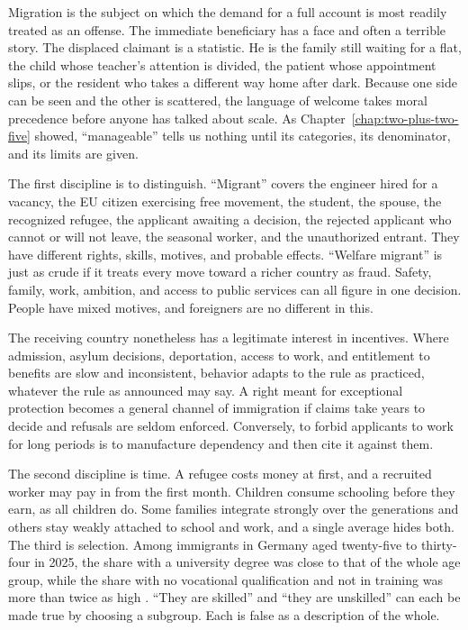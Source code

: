 \documentclass[12pt,a4paper]{book}
\begin{document}
Migration is the subject on which the demand for a full account is most readily treated as an offense. The immediate beneficiary has a face and often a terrible story. The displaced claimant is a statistic. He is the family still waiting for a flat, the child whose teacher's attention is divided, the patient whose appointment slips, or the resident who takes a different way home after dark. Because one side can be seen and the other is scattered, the language of welcome takes moral precedence before anyone has talked about scale. As Chapter~\ref{chap:two-plus-two-five} showed, ``manageable'' tells us nothing until its categories, its denominator, and its limits are given.

The first discipline is to distinguish. ``Migrant'' covers the engineer hired for a vacancy, the EU citizen exercising free movement, the student, the spouse, the recognized refugee, the applicant awaiting a decision, the rejected applicant who cannot or will not leave, the seasonal worker, and the unauthorized entrant. They have different rights, skills, motives, and probable effects. ``Welfare migrant'' is just as crude if it treats every move toward a richer country as fraud. Safety, family, work, ambition, and access to public services can all figure in one decision. People have mixed motives, and foreigners are no different in this.

The receiving country nonetheless has a legitimate interest in incentives. Where admission, asylum decisions, deportation, access to work, and entitlement to benefits are slow and inconsistent, behavior adapts to the rule as practiced, whatever the rule as announced may say. A right meant for exceptional protection becomes a general channel of immigration if claims take years to decide and refusals are seldom enforced. Conversely, to forbid applicants to work for long periods is to manufacture dependency and then cite it against them.

The second discipline is time. A refugee costs money at first, and a recruited worker may pay in from the first month. Children consume schooling before they earn, as all children do. Some families integrate strongly over the generations and others stay weakly attached to school and work, and a single average hides both. The third is selection. Among immigrants in Germany aged twenty-five to thirty-four in 2025, the share with a university degree was close to that of the whole age group, while the share with no vocational qualification and not in training was more than twice as high \cite{DestatisMigration2026}. ``They are skilled'' and ``they are unskilled'' can each be made true by choosing a subgroup. Each is false as a description of the whole.
\end{document}
